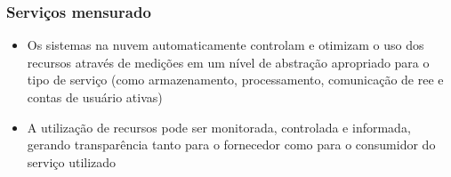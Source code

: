 \begin{frame}
	\frametitle{Serviços mensurado}
	\begin{itemize}
		\item Os sistemas na nuvem automaticamente controlam e otimizam o uso dos recursos através de medições em um nível de abstração apropriado para o tipo de serviço (como armazenamento, processamento, comunicação de ree e contas de usuário ativas)
		\item A utilização de recursos pode ser monitorada, controlada e informada, gerando transparência tanto para o fornecedor como para o consumidor do serviço utilizado
	\end{itemize}
\end{frame}
